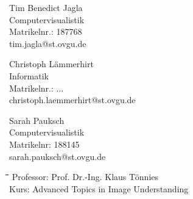 \documentclass[liststotoc,11pt,a4paper]{article}
\begin{document}
\begin{figure}[htbp]
\begin{minipage}[t]{4.5cm}
\begin{flushleft}
Tim Benedict Jagla \\
Computervisualistik\\
Matrikelnr.: 187768\\ 
tim.jagla@st.ovgu.de\\
\end{flushleft}
\end{minipage}
\begin{minipage}[t]{4.8cm}
\begin{flushleft}
Christoph Lämmerhirt\\
Informatik\\
Matrikelnr.: ...\\
christoph.laemmerhirt@st.ovgu.de\\
\end{flushleft}
\end{minipage}
\hfill
\begin{minipage}[t]{4.5cm}
\begin{flushleft} 
Sarah Pauksch\\
Computervisualistik\\
Matrikelnr: 188145\\ 
sarah.pauksch@st.ovgu.de\\
\end{flushleft}
\end{minipage}
\end{figure}

\vspace{\fill}

\begin{figure}[htbp]
\begin{minipage}[b]{0.475\textwidth}
\vspace{0pt}
\begin{flushright}    
\begin {tabbing}
\hspace*{5cm}\=\hspace{2,5cm}\=\hspace{5cm}\=\hspace{2.5cm}\=\hspace{2.5cm}\=\kill
Professor:	\>Prof. Dr.-Ing. Klaus Tönnies\\
Kurs: \>Advanced Topics in Image Understanding\\

\end{tabbing}
\end{flushright}
\end{minipage}
\hfill
\begin{minipage}[b]{0.475\textwidth}
\centering
\end{minipage}
\end{figure}
\end{document}
